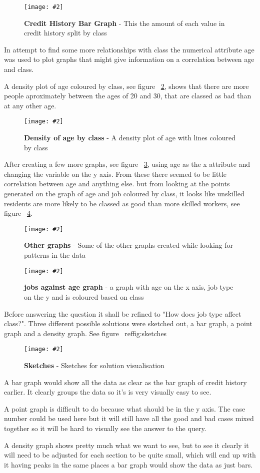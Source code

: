 \documentclass[12pt, a4paper]{article}
\newcommand{\figuremacro}[5]{
	\begin{figure}[#1]
		\centering
		\texttt{[image: \#2]}
		\caption[#3]{\textbf{#3}#4}
		\label{fig:#2}
	\end{figure}
}
\begin{document}
	\figuremacro{h}{credithistory}{Credit History Bar Graph}{ - This the amount of each value in credit history split by class}{1.0}
	
	In attempt to find some more relationships with class the numerical attribute age was used to plot graphs that might give information on a correlation between age and class.
	
	A density plot of age coloured by class, see figure ~\ref{fig:agedense}, shows that there are more people aproximately between the ages of 20 and 30, that are classed as bad than at any other age.
	
	\figuremacro{h}{agedense}{Density of age by class}{ - A density plot of age with lines coloured by class}{1.0}
	
	After creating a few more graphs, see figure ~\ref{fig:graphs}, using age as the x attribute  and changing the variable on the y axis. From these there seemed to be little correlation  between age and anything else. but from looking at the points generated on the graph of age and job coloured by class, it looks like unskilled residents are more likely to be classed as good than more skilled workers, see figure ~\ref{fig:agejob}.
	
	
	\figuremacro{h}{graphs}{Other graphs}{ - Some of the other graphs created while looking for patterns in the data}{1.0}
	\figuremacro{h}{agejob}{jobs against age graph}{ - a graph with age on the x axis, job type on the y and is coloured based on class}{1.0}
	
	Before answering the question it shall be refined to "How does job type affect class?". Three different possible solutions were sketched out, a bar graph, a point graph and a density graph. See figure ~ref{fig:sketches} 
	
	\figuremacro{h}{sketches}{Sketches}{ - Sketches for solution visualisation}{1.0}
	
	A bar graph would show all the data as clear as the bar graph of credit history earlier. It clearly groups the data so it's is very visually easy to see.
	
	A point graph is difficult to do because what should be in the y axis. The case number could be used here but it will still have all the good and bad cases mixed together so it will be hard to visually see the answer to the query.
	
	A density graph shows pretty much what we want to see, but to see it clearly it will need to be adjusted for each section to be quite small, which will end up with it having peaks in the same places a bar graph would show the data as just bars.
	
\end{document}
